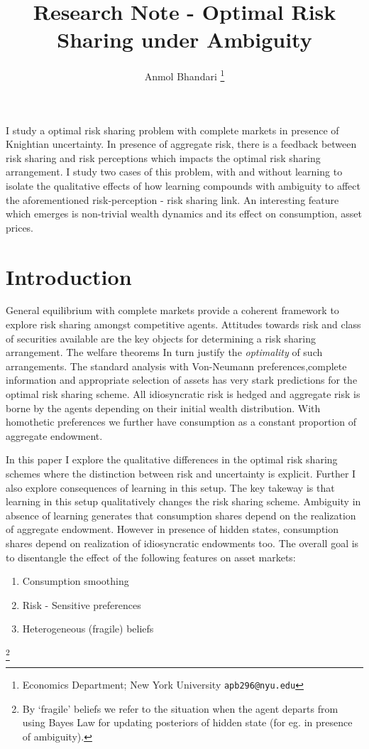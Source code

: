 \documentclass[12pt]{article}
\begin{document}
\title{Research Note  - Optimal Risk Sharing under Ambiguity}
\author{Anmol Bhandari \thanks{Economics Department; New York University \texttt{apb296@nyu.edu}}}
\maketitle
I study a optimal risk sharing problem with complete markets in presence of Knightian uncertainty. In presence of aggregate risk, there is a feedback between risk sharing and risk perceptions which impacts the optimal risk sharing arrangement. I study two cases of this problem, with and without learning to isolate the qualitative effects of how learning compounds with ambiguity to affect the aforementioned risk-perception - risk sharing link. An interesting feature which emerges is non-trivial wealth dynamics and its effect on consumption, asset prices.
\newpage

\section{Introduction}
\noindent General equilibrium with complete markets provide a coherent framework to explore risk sharing amongst competitive agents. Attitudes towards risk and class of securities available are the key objects for determining a risk sharing arrangement. The welfare theorems In turn justify the \emph{optimality} of such arrangements. The standard analysis with Von-Neumann preferences,complete information and appropriate selection of assets has very stark predictions for the optimal risk sharing scheme. All idiosyncratic risk is hedged and aggregate risk is borne by the agents depending on their initial wealth distribution. With homothetic preferences we further have consumption as a constant proportion of aggregate endowment. 

\vspace{3mm}

\noindent In this paper I explore the qualitative differences in the optimal risk sharing schemes where the distinction between risk and uncertainty is explicit. Further I also explore consequences of learning in this setup. The key takeway is that learning in this setup qualitatively changes the risk sharing scheme. Ambiguity in absence of learning generates that consumption shares depend on the realization of aggregate endowment. However in presence of hidden states, consumption shares depend on realization of idiosyncratic endowments too. The overall goal is to disentangle the effect of the following features on asset markets:
\begin{enumerate}
	\item Consumption smoothing
	\item Risk - Sensitive preferences
	\item Heterogeneous (fragile) beliefs 
\end{enumerate} 
\footnote{By `fragile' beliefs we refer to the situation when the agent departs from using Bayes Law for updating posteriors of hidden state (for eg. in presence of ambiguity).}
\end{document}
